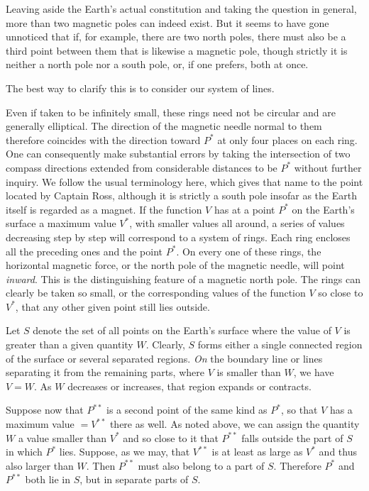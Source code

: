 Leaving aside the Earth's actual constitution and taking the question in general, more than two magnetic poles can indeed exist. But it seems to have gone unnoticed that if, for example, there are two north poles, there must also be a third point between them that is likewise a magnetic pole, though strictly it is neither a north pole nor a south pole, or, if one prefers, both at once.

The best way to clarify this is to consider our system of lines.

\expandafter\def\csname HistoricalNoteText16\endcsname{Even if taken to be infinitely small, these rings need not be circular and are generally elliptical. The direction of the magnetic needle normal to them therefore coincides with the direction toward $P^*$ at only four places on each ring. One can consequently make substantial errors by taking the intersection of two compass directions extended from considerable distances to be $P^*$ without further inquiry.}
\expandafter\def\csname HistoricalNoteText17\endcsname{We follow the usual terminology here, which gives that name to the point located by Captain Ross, although it is strictly a south pole insofar as the Earth itself is regarded as a magnet.}
If the function $V$ has at a point $P^*$ on the Earth's surface a maximum value $V^*$, with smaller values all around, a series of values decreasing step by step will correspond to a system of rings. Each ring encloses all the preceding ones and the point $P^*$. On every one of these rings, the horizontal magnetic force, or the north pole of the magnetic needle, will point \textit{inward}. This is the distinguishing feature of a magnetic north pole{\renewcommand{\thefootnote}{**)}}. The rings can clearly be taken so small, or the corresponding values of the function $V$ so close to $V^*$, that any other given point still lies outside.

Let $S$ denote the set of all points on the Earth's surface where the value of $V$ is greater than a given quantity $W$. Clearly, $S$ forms either a single connected region of the surface or several separated regions. \textit{On} the boundary line or lines separating it from the remaining parts, where $V$ is smaller than $W$, we have $V=W$. As $W$ decreases or increases, that region expands or contracts.

Suppose now that $P^{**}$ is a second point of the same kind as $P^*$, so that $V$ has a maximum value $=V^{**}$ there as well. As noted above, we can assign the quantity $W$ a value smaller than $V^*$ and so close to it that $P^{**}$ falls outside the part of $S$ in which $P^*$ lies. Suppose, as we may, that $V^{**}$ is at least as large as $V^*$ and thus also larger than $W$. Then $P^{**}$ must also belong to a part of $S$. Therefore $P^*$ and $P^{**}$ both lie in $S$, but in separate parts of $S$.

